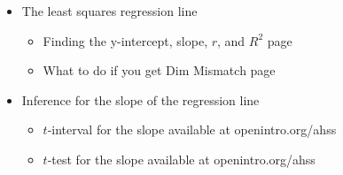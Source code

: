 \begin{itemize}
\item[] The least squares regression line
\begin{itemize}\vspace{-1mm}
\setlength{\itemsep}{0mm}
\item[] Finding the y-intercept, slope, $r$, and $R^2$ \hfill page~\pageref{calclinreg}
\item[] What to do if you get Dim Mismatch \hfill page~\pageref{dimmismatch}
\end{itemize}


\item[] Inference for the slope of the regression line
\begin{itemize}\vspace{-1mm}
\setlength{\itemsep}{0mm}
\item[] $t$-interval for the slope \hfill available at openintro.org/ahss
\item[] $t$-test for the slope \hfill available at openintro.org/ahss
\end{itemize}



\end{itemize}


